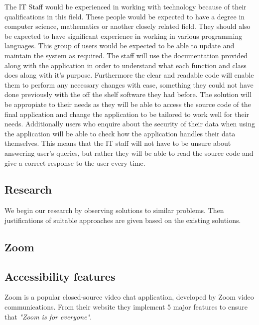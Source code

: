 The IT Staff would be experienced in working with technology
because of their qualifications in this field. These people 
would be expected to have a degree in computer science,
mathematics or another closely related field. They should also 
be expected to have significant experience in working in 
various programming languages. This group of users would be
expected to be able to update and maintain the system as 
required. The staff will use the documentation provided along
with the application in order to understand what each function
and class does along with it's purpose. Furthermore the clear 
and readable code will enable them to perform any necessary
changes with ease, something they could not have done
previously with the off the shelf software they had before. 
The solution will be appropiate to their needs as they will be
able to access the source code of the final application and 
change the application to be tailored to work well for their 
needs. Additionally users who enquire about the security of 
their data when using the application will be able to check 
how the application handles their data themselves. This means 
that the IT staff will not have to be unsure about answering 
user's queries, but rather they will be able to read the source
code and give a correct response to the user every time.

\subsection{Research}
\label{sec:research}


We begin our research by observing solutions to similar 
problems. Then justifications of suitable approaches are given
based on the existing solutions.

\subsection*{Zoom}

\subsection*{Accessibility features}

Zoom is a popular closed-source video chat application,
developed by Zoom video communications. From their website 
\cite{zoom} they implement 5 major features to ensure that 
\textit{"Zoom is for everyone"}. 

